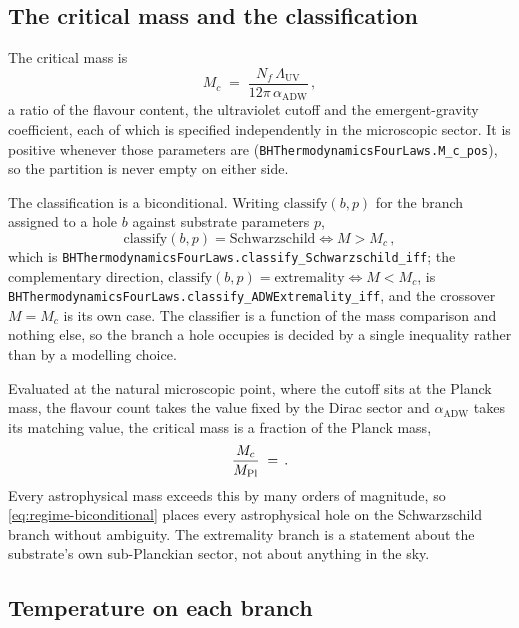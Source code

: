 \documentclass[aps,prd,nofootinbib,superscriptaddress,12pt]{revtex4-2}
\DeclareRobustCommand{\lb}{\discretionary{}{}{}}
\begin{document}
\subsection{The critical mass and the classification}
\label{sec:regime-theorem}

The critical mass is
\begin{equation}
\label{eq:Mc-regime}
M_c \;=\; \frac{N_f\,\Lambda_{\mathrm{UV}}}{12\pi\,\alpha_{\mathrm{ADW}}}\,,
\end{equation}
a ratio of the flavour content, the ultraviolet cutoff and the emergent-gravity
coefficient, each of which is specified independently in the microscopic sector.
It is positive whenever those parameters are
(\texttt{BHThermodynamics\lb{}Four\lb{}Laws.\lb{}M\_\lb{}c\_\lb{}pos}), so the partition is never empty
on either side.

The classification is a biconditional. Writing $\mathrm{classify}(b,p)$ for the
branch assigned to a hole $b$ against substrate parameters $p$,
\begin{equation}
\label{eq:regime-biconditional}
\mathrm{classify}(b,p) = \text{Schwarzschild}
\iff M > M_c\,,
\end{equation}
which is \texttt{BHThermodynamics\lb{}Four\lb{}Laws.\lb{}classify\_\lb{}Schwarzschild\_\lb{}iff}; the
complementary direction, $\mathrm{classify}(b,p) = \text{extremality}
\iff M < M_c$, is
\texttt{BHThermodynamics\lb{}Four\lb{}Laws.\lb{}classify\_\lb{}ADWExtremality\_\lb{}iff}, and the
crossover $M = M_c$ is its own case. The classifier is a function of the mass
comparison and nothing else, so the branch a hole occupies is decided by a
single inequality rather than by a modelling choice.

Evaluated at the natural microscopic point, where the cutoff sits at the Planck
mass, the flavour count takes the value fixed by the Dirac sector and
$\alpha_{\mathrm{ADW}}$ takes its matching value, the critical mass is a
fraction of the Planck mass,
\begin{equation}
\label{eq:Mc-planck}
\frac{M_c}{M_{\mathrm{Pl}}} \;=\; \unskip\,.
\end{equation}
Every astrophysical mass exceeds this by many orders of magnitude, so
\eqref{eq:regime-biconditional} places every astrophysical hole on the
Schwarzschild branch without ambiguity. The extremality branch is a statement
about the substrate's own sub-Planckian sector, not about anything in the sky.

\subsection{Temperature on each branch}
\label{sec:regime-temperature}
\end{document}
